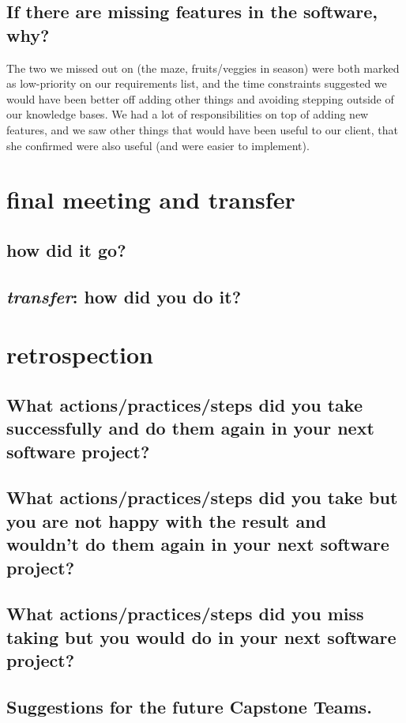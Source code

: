 \documentclass[12pt, letterpaper]{article}
\begin{document}
\subsection{If there are missing features in the software, why?}
	The two we missed out on (the maze, fruits/veggies in season) were both marked as low-priority on our requirements list, and the time constraints suggested we would have been better off adding other things and avoiding stepping outside of our knowledge bases. We had a lot of responsibilities on top of adding new features, and we saw other things that would have been useful to our client, that she confirmed were also useful (and were easier to implement).

\section{final meeting and transfer}
\subsection{how did it go?}

\subsection{\emph{transfer}: how did you do it?}

\section{retrospection}
\subsection{What actions/practices/steps did you take successfully and do them again in your next software project?}

\subsection{What actions/practices/steps did you take but you are not happy with the result and wouldn't do them again in your next software project?}

\subsection{What actions/practices/steps did you miss taking but you would do in your next software project?}

\subsection{Suggestions for the future Capstone Teams.}
\end{document}

